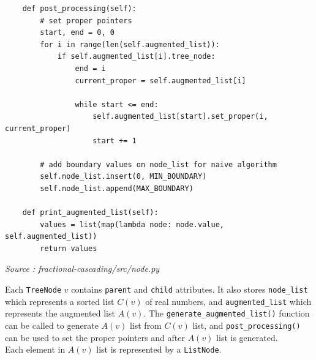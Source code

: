\documentclass[12pt,english,]{article}
\newcommand{\code}[1]{\colorbox{light-gray}{\texttt{#1}}}
\begin{document}
\begin{lstlisting}
    def post_processing(self):
        # set proper pointers
        start, end = 0, 0
        for i in range(len(self.augmented_list)):
            if self.augmented_list[i].tree_node:
                end = i
                current_proper = self.augmented_list[i]

                while start <= end:
                    self.augmented_list[start].set_proper(i, current_proper)
                    start += 1

        # add boundary values on node_list for naive algorithm
        self.node_list.insert(0, MIN_BOUNDARY)
        self.node_list.append(MAX_BOUNDARY)

    def print_augmented_list(self):
        values = list(map(lambda node: node.value, self.augmented_list))
        return values

\end{lstlisting}
\vspace{-9truemm}
\begin{minipage}{1\textwidth}
  \begin{flushright}
  {\footnotesize \emph{Source \footnotemark: fractional-cascading/src/node.py }\par}
  \end{flushright}
\end{minipage}
\vspace{0.5truemm}

Each \code{TreeNode} $v$ contains \code{parent} and \code{child} attributes. It also
stores  \code{node\_list} which represents a sorted list $C(v)$ of real numbers, and 
\code{augmented\_list} which represents the augmented list $A(v)$. The 
\code{generate\_augmented\_list()} function can be called to generate $A(v)$ list from $C(v)$ 
list, and \code{post\_processing()} can be used to set the proper pointers and after $A(v)$ 
list is generated. \\

Each element in $A(v)$ list is represented by a \code{ListNode}.

~
\end{document}
